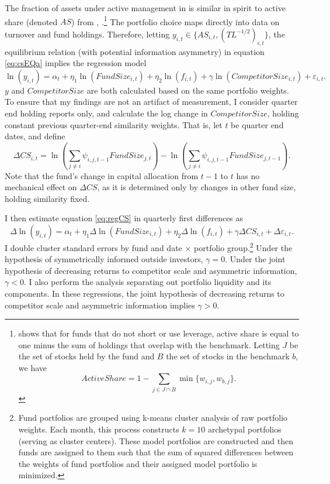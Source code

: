 \documentclass[]{book}
\let\rmarkdownfootnote\footnote%
\def\footnote{\protect\rmarkdownfootnote}
\theoremstyle{definition}
\theoremstyle{definition}
\theoremstyle{definition}
\theoremstyle{remark}
\begin{document}
The fraction of assets under active management in \citet{bg04} is
similar in spirit to active share (denoted \(AS\)) from \citet{cp09},
\citet{petajisto13}.\footnote{\citet{cremers17} shows that for funds
  that do not short or use leverage, active share is equal to one minus
  the sum of holdings that overlap with the benchmark. Letting \(J\) be
  the set of stocks held by the fund and \(B\) the set of stocks in the
  benchmark \(b\), we have
  \[ ActiveShare=1-\sum_{j\in J\cap B} \min\{ w_{i,j},w_{b,j} \}.\]} The
\citet{pst17L} portfolio choice maps directly into data on turnover and
fund holdings. Therefore, letting
\(y_{i,t}\in\{AS_{i,t},\left(TL^{-1/2}\right)_{i,t}\}\), the equilibrium
relation (with potential information asymmetry) in equation
\eqref{eq:csEQa} implies the regression model \begin{equation}
\ln(y_{i,t})=\alpha_t + \eta_1 \ln(FundSize_{i,t}) +\eta_2 \ln(f_{i,t}) + \gamma\ln(CompetitorSize_{i,t}) + \varepsilon_{i,t}.
\label{eq:regCS}
\end{equation} \(y\) and \(CompetitorSize\) are both calculated based on
the same portfolio weights. To ensure that my findings are not an
artifact of measurement, I consider quarter end holding reports only,
and calculate the log change in \(CompetitorSize\), holding constant
previous quarter-end similarity weights. That is, let \(t\) be quarter
end dates, and define \begin{equation}
\Delta CS_{i,t}=\ln \left(\sum_{j\neq i} \psi_{i,j,t-1} FundSize_{j,t}\right) - \ln \left(\sum_{j\neq i} \psi_{i,j,t-1} FundSize_{j,t-1}\right).
\end{equation} Note that the fund's change in capital allocation from
\(t-1\) to \(t\) has no mechanical effect on \(\Delta CS\), as it is
determined only by changes in other fund size, holding similarity fixed.

I then estimate equation \eqref{eq:regCS} in quarterly first differences
as \begin{equation}
\Delta\ln(y_{i,t})=\alpha_t + \eta_1 \Delta\ln(FundSize_{i,t}) +\eta_2 \Delta\ln(f_{i,t}) + \gamma\Delta CS_{i,t} + \Delta\varepsilon_{i,t}.
\label{eq:fdReg}
\end{equation} I double cluster standard errors by fund and date
\(\times\) portfolio group.\footnote{
Fund portfolios are grouped using k-means cluster analysis of raw portfolio weights. Each month, this process constructs $k=10$ archetypal portfolios (serving as cluster centers). These model portfolios are constructed and then funds are assigned to them such that the sum of squared differences between the weights of fund portfolios and their assigned model portfolio is minimized.
} Under the hypothesis of symmetrically informed outside investors,
\(\gamma=0\). Under the joint hypothesis of decreasing returns to
competitor scale and asymmetric information, \(\gamma<0\). I also
perform the analysis separating out portfolio liquidity and its
components. In these regressions, the joint hypothesis of decreasing
returns to competitor scale and asymmetric information implies
\(\gamma>0\).
\end{document}
